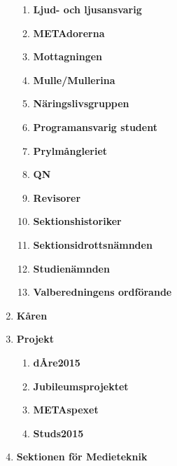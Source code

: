 \documentclass[a4paper]{article}
\begin{document}
\begin{enumerate}
\begin{enumerate}
    \item \textbf{Ljud- och ljusansvarig}

    \item \textbf{METAdorerna}

    \item \textbf{Mottagningen}

    \item \textbf{Mulle/Mullerina}

    \item \textbf{Näringslivsgruppen}

    \item \textbf{Programansvarig student}

    \item \textbf{Prylmångleriet}

    \item \textbf{QN} 

    \item \textbf{Revisorer}

    \item \textbf{Sektionshistoriker}

    \item \textbf{Sektionsidrottsnämnden}

    \item \textbf{Studienämnden}

    \item \textbf{Valberedningens ordförande} 

  \end{enumerate}

\item \textbf{Kåren}

\item \textbf{Projekt}

  \begin{enumerate}

    \item \textbf{dÅre2015}

    \item \textbf{Jubileumsprojektet}

    \item \textbf{METAspexet}

    \item \textbf{Studs2015}

  \end{enumerate}

\item \textbf{Sektionen för Medieteknik}

\end{enumerate}
\end{document}
